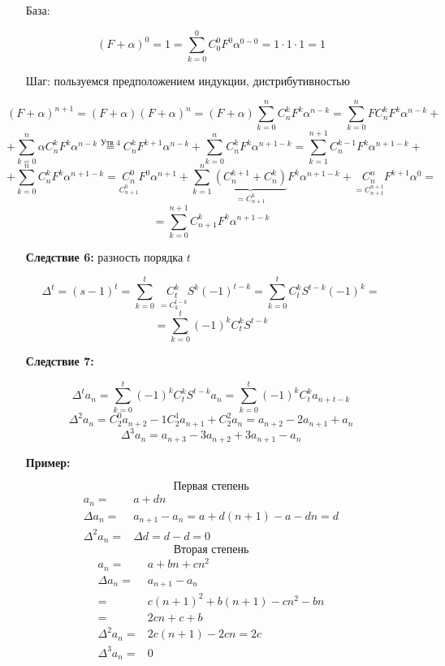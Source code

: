 \documentclass[12pt, letterpaper, twoside]{article}
\begin{document}
\begin{enumerate}
    \item[База:]
\end{enumerate}
\[(F + \alpha)^0 = 1 = \sum_{k = 0}^{0}C_0^0F^0\alpha^{0 - 0} = 1\cdot 1\cdot 1 = 1\]
\begin{enumerate}
    \item[Шаг:] пользуемся предположением индукции, дистрибутивностью
\end{enumerate}
\[(F + \alpha)^{n + 1} = (F + \alpha)(F + \alpha)^n = (F + \alpha)\sum_{k = 0}^n C_n^k F^k\alpha^{n - k} = \sum_{k =0}^{n} FC^k_n F^k \alpha^{n -k} +\]
\[+ \sum_{k = 0}^{n} \alpha C_n^k F^k\alpha^{n - k} \overset{\text{Утв 4}}{=} C_n^k F^{k + 1}\alpha^{n - k} + \sum_{k = 0}^{n} C_n^k F^k \alpha^{n + 1 - k} = \sum_{k = 1}^{n + 1}C_n^{k - 1}F^k\alpha^{n + 1 - k} +\]
\[+ \sum_{k = 0}^{n}C_n^k F^k \alpha^{n + 1 - k} = \underset{C_{n + 1}^0}{C_n^0}F^0\alpha^{n + 1} + \sum_{k = 1}^n\underset{=C^k_{n + 1}}{\underbrace{(C_{n}^{k + 1} + C_n^k)}}F^k\alpha^{n + 1 - k} + \underset{=C_{n + 1}^{n + 1}}{C_n^n} F^{k + 1}\alpha^0 =\]
\[= \sum_{k = 0}^{n + 1}C_{n + 1}^k F^k \alpha^{n + 1 - k}\]
\newpage
\begin{enumerate}
    \item[\textbf{Следствие 6:}] разность порядка $t$
\end{enumerate}
\[\Delta^t = (s - 1)^t = \sum_{k = 0}^{t}\  \underset{=C^{t - k}_{k}}{C_t^k} S^k (-1)^{t - k} = \sum_{k = 0}^{t} C_t^k S^{t - k}(-1)^k =\]
\[= \sum_{k = 0}^{t}(-1)^k C_t^k S^{t - k}\]
\begin{enumerate}
    \item[\textbf{Следствие 7:}]
\end{enumerate}
\[\Delta^t a_n = \sum_{k = 0}^t (-1)^k C_t^k S^{t - k} a_n = \sum_{k = 0}^t (-1)^k C_t^k a_{n + t - k}\]
\[\Delta^2 a_n = C_2^0 a_{n + 2} - 1C_2^1 a_{n + 1} + C_2^2a_n = a_{n + 2} - 2a_{n + 1} + a_n\]
\[\Delta^3 a_n = a_{n + 3} - 3a_{n + 2} + 3a_{n + 1} - a_{n}\]
\begin{enumerate}
    \item[\textbf{Пример:}]
\end{enumerate}
\[\text{Первая степень}\]
\begin{align*}
    a_n =& a + dn\\  
    \Delta a_n =& a_{n + 1} - a_{n} = a + d(n + 1) - a - dn = d\\
    \Delta^2 a_n =& \Delta d = d - d = 0
\end{align*}
\[\text{Вторая степень}\]
\begin{align*}
    a_n =& a + bn + cn^2\\
    \Delta a_n =& a_{n + 1} - a_n\\
    =& c(n + 1)^2 + b(n + 1) - cn^2 - bn\\
    =& 2cn + c + b\\
    \Delta^2 a_n =& 2c(n + 1) - 2cn = 2c\\
    \Delta^3 a_n =& 0
\end{align*}
\end{document}
